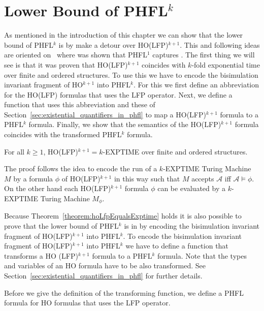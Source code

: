 

\section{Lower Bound of PHFL$^k$}\label{sec:lowerBoundOfPhfl}

As mentioned in the introduction of this chapter we can show that the lower bound of PHFL$^k$ is  by
make a detour over HO(LFP)$^{k+1}$. This and following ideas are oriented on~\cite{lange2014capturing} where was
shown that PHFL$^1$ captures . The first thing we will see is that it was proven that HO(LFP)$^{k +
1}$ coincides with $k$-fold exponential time over finite and ordered structures. To use this we have to encode the
bisimulation invariant fragment of HO$^{k+1}$ into PHFL$^k$. For this we first define an abbreviation for the HO(LFP)
formulas that uses the LFP operator. Next, we define a function that uses this abbreviation and these of
Section~\ref{sec:existential_quantifiers_in_phfl} to map a HO(LFP)$^{k+1}$ formula to a PHFL$^k$ formula. Finally, we
show that the semantics of the HO(LFP)$^{k+1}$ formula coincides with the transformed PHFL$^k$ formula.

\begin{theorem}{\cite{freireMartins2011descriptive}}\label{theorem:hoLfpEqualsExptime}
    For all $k \geq 1$, HO(LFP)$^{k + 1} = k$-EXPTIME over finite and ordered structures.
\end{theorem}

The proof follows the idea to encode the run of a $k$-EXPTIME Turing Machine $M$ by a formula $\phi$ of HO(LFP)$^{k +
1}$ in this way such that $M$ accepts $\mathcal{A}$ iff $\mathcal{A} \models \phi$. On the other hand each HO(LFP)$^{k +
1}$ formula $\phi$ can be evaluated by a $k$-EXPTIME Turing Machine $M_\phi$.

Because Theorem~\ref{theorem:hoLfpEqualsExptime} holds it is also possible to prove that the lower bound of PHFL$^k$
is in  by encoding the bisimulation invariant fragment of HO(LFP)$^{k + 1}$ into PHFL$^k$. To encode the
bisimulation invariant fragment of HO(LFP)$^{k + 1}$ into PHFL$^k$ we have to define a function that transforms a HO
(LFP)$^{k + 1}$ formula to a PHFL$^k$ formula. Note that the types and variables of an HO formula have to be also
transformed. See Section~\ref{sec:existential_quantifiers_in_phfl} for further details.

Before we give the definition of the transforming function, we define a PHFL formula for HO formulas that uses the
LFP operator.

